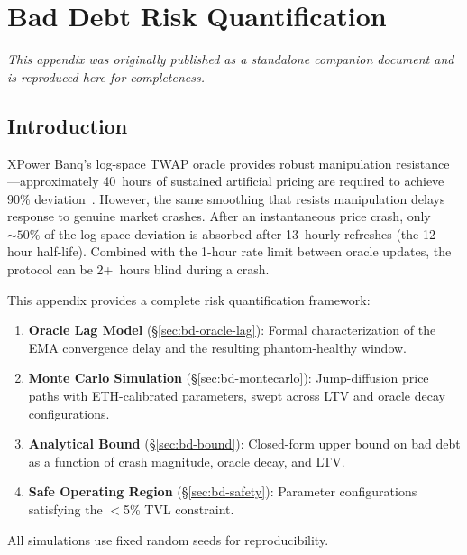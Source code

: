 \documentclass[10pt,a4paper,twocolumn]{article}
\theoremstyle{definition}
\theoremstyle{plain}
\theoremstyle{remark}
\begin{document}
\section{Bad Debt Risk Quantification}
\label{apx:bad-debt}

\noindent\textit{This appendix was originally published as a standalone companion document and is reproduced here for completeness.}

\subsection{Introduction}
\label{sec:bd-intro}

XPower Banq's log-space TWAP oracle provides robust manipulation resistance---approximately 40~hours of sustained artificial pricing are required to achieve 90\% deviation~\cite{mackinga2022}. However, the same smoothing that resists manipulation delays response to genuine market crashes. After an instantaneous price crash, only ${\sim}50\%$ of the log-space deviation is absorbed after 13~hourly refreshes (the 12-hour half-life). Combined with the 1-hour rate limit between oracle updates, the protocol can be 2+~hours blind during a crash.

This appendix provides a complete risk quantification framework:
\begin{enumerate}[leftmargin=*]
\item \textbf{Oracle Lag Model} (\S\ref{sec:bd-oracle-lag}): Formal characterization of the EMA convergence delay and the resulting phantom-healthy window.
\item \textbf{Monte Carlo Simulation} (\S\ref{sec:bd-montecarlo}): Jump-diffusion price paths with ETH-calibrated parameters, swept across LTV and oracle decay configurations.
\item \textbf{Analytical Bound} (\S\ref{sec:bd-bound}): Closed-form upper bound on bad debt as a function of crash magnitude, oracle decay, and LTV.
\item \textbf{Safe Operating Region} (\S\ref{sec:bd-safety}): Parameter configurations satisfying the $<$5\% TVL constraint.
\end{enumerate}

All simulations use fixed random seeds for reproducibility.

\end{document}
